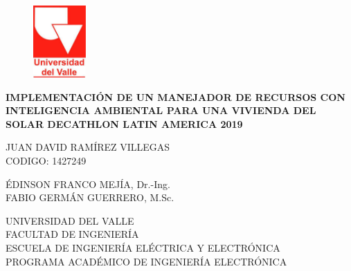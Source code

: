 \pagestyle{empty}
\begin{center}

\begin{figure}[htbp]
	\centering
		\includegraphics[width=2cm]{figuras/uv_logo.png}
\end{figure}

\vspace{2cm}

\textbf{\large{IMPLEMENTACI\'ON DE UN MANEJADOR DE RECURSOS CON INTELIGENCIA AMBIENTAL PARA UNA VIVIENDA DEL SOLAR DECATHLON LATIN AMERICA 2019}}

\vspace{2cm}

\large{
JUAN DAVID RAMÍREZ VILLEGAS\\
CODIGO: 1427249
}

\vspace{3cm}

\large{ÉDINSON FRANCO MEJÍA, Dr.-Ing.}\\
\large{FABIO GERMÁN GUERRERO, M.Sc.}\\

\vspace{2cm}

\large{UNIVERSIDAD DEL VALLE}\\
\large{FACULTAD DE INGENIERÍA}\\
\large{ESCUELA DE INGENIERÍA ELÉCTRICA Y ELECTRÓNICA}\\
\large{PROGRAMA ACADÉMICO DE INGENIERÍA ELECTRÓNICA}\\
\vspace{1cm}
\large{\Today}


\vspace{4cm}

\end{center}
\newpage